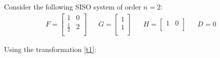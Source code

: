\begin{example}{Consider the following SISO system of order $n=2$:}
\begin{align*}
    F = \begin{bmatrix}
        1 & 0\\
        \frac{1}{2} & 2\\
    \end{bmatrix}
    &&
    G = \begin{bmatrix}
        1\\
        1\\
    \end{bmatrix}
    &&
    H = \begin{bmatrix}
        1 & 0\\
    \end{bmatrix}
    &&
    D = 0
\end{align*}

Using the transformation \ref{t1}:
\vspace{-10pt}


\end{example}

